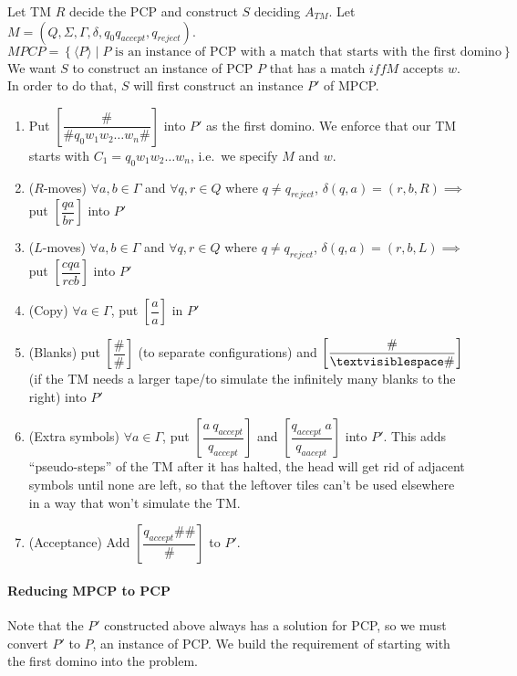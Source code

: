 \documentclass[12 pt]{article}
\begin{document}
Let TM $R$ decide the PCP and construct $S$ deciding $A_{TM}$. Let $M
= (Q, \Sigma, \Gamma, \delta, q_0 q_{accept}, q_{reject})$.
\\ $MPCP =  \left\{\langle P \rangle \mid P \text{ is an instance of
    PCP with a match that starts with the first domino}\right\}$
\\ We want $S$ to construct an instance of PCP $P$ that has a match
$iff M$ accepts $w$. In order to do that, $S$ will first construct an
instance $P'$ of MPCP.
\begin{enumerate}
\item Put $\left[\dfrac{\#}{\# q_0 w_1 w_2 \ldots w_n \#}\right]$ into
  $P'$ as the first domino. We enforce that our TM starts with $C_1 =
  q_0 w_1w_2 \ldots w_n$, i.e.\ we specify $M$ and $w$.
\item ($R$-moves) $\forall a,b \in \Gamma$ and $\forall q,r \in Q$
  where $q \neq q_{reject}$, $\delta(q,a) = (r,b,R) \implies$ put
  $\left[\dfrac{qa}{br}\right]$ into $P'$
\item ($L$-moves) $\forall a,b \in \Gamma$ and $\forall q,r \in Q$
  where $q \neq q_{reject}$, $\delta(q,a) = (r,b,L) \implies$ put
  $\left[\dfrac{cqa}{rcb}\right]$ into $P'$
\item (Copy) $\forall a \in \Gamma$, put $\left[\dfrac{a}{a}\right]$
  in $P'$
\item (Blanks) put $\left[\dfrac{\#}{\#}\right]$ (to separate
  configurations) and $\left[\dfrac{\#}{\textvisiblespace\#}\right]$
  (if the TM needs a larger tape/to simulate the infinitely many
  blanks to the right) into $P'$
\item (Extra symbols) $\forall a \in \Gamma$, put $\left[\dfrac{a\
      q_{accept}}{q_{accept}}\right]$ and $\left[\dfrac{q_{accept}\
      a}{q_{aacept}}\right]$ into $P'$. This adds ``pseudo-steps'' of
  the TM after it has halted, the head will get rid of adjacent
  symbols until none are left, so that the leftover tiles can't be
  used elsewhere in a way that won't simulate the TM.
\item (Acceptance) Add $\left[\dfrac{q_{accept}\#\#}{\#}\right]$ to $P'$.
\end{enumerate}
\paragraph{Reducing MPCP to PCP} Note that the $P'$ constructed above
always has a solution for PCP, so we must convert $P'$ to $P$, an
instance of PCP. We build the requirement of starting with the first
domino into the problem.
\end{document}
